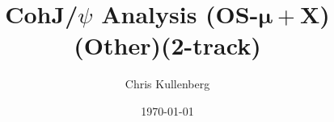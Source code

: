 \title{CohJ/$\psi$ Analysis (\textbf{OS}-$\boldsymbol{\mu+}$\textbf{X})(\textbf{Other})(\textbf{2-track})}
\author{Chris Kullenberg}
\date{\today}
